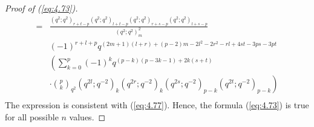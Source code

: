 \documentclass[table,a4paper,reqno]{amsart}
\numberwithin{equation}{section}
\newtheorem{proposition}[theorem]{Proposition}
\theoremstyle{definition}
\begin{document}
\begin{proof}[Proof of (\ref{eq:4.73})]
\begin{equation}
\begin{split}
            =&\frac{(q^2;q^2)_{r+t-p}(q^2;q^2)_{l+t-p}(q^2;q^2)_{r+s-p}(q^2;q^2)_{l+s-p}}{(q^2;q^2)_m^2}\\
            &(-1)^{r+l+p}q^{(2m+1)(l+r)+(p-2)m-2l^2-2r^2-rl+4st-3ps-3pt}\\
            &\left(\sum_{k=0}^{p}(-1)^{k}q^{(p-k)(p-3k-1)+2k(s+t)}\right.\\
            &\left.\cdot{p\choose k}_{q^{2}}(q^{2l};q^{-2})_k(q^{2r};q^{-2})_k(q^{2s};q^{-2})_{p-k}(q^{2t};q^{-2})_{p-k}\right)\\
        \end{split}
    \end{equation}
    The expression is consistent with (\ref{eq:4.77}). Hence, the formula (\ref{eq:4.73}) is true for all possible $n$ values.
\end{proof}


    
\end{document}
